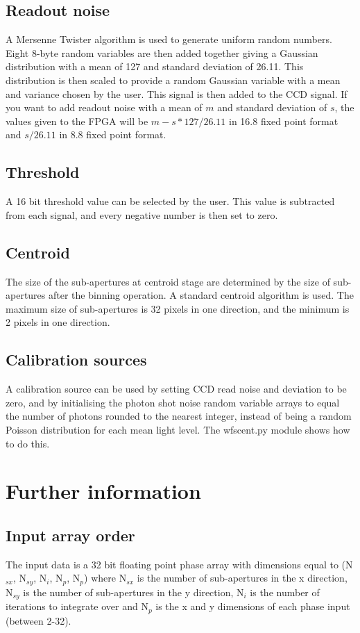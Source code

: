\documentclass{article}
\begin{document}
\subsection{Readout noise}
A Mersenne Twister algorithm is used to generate uniform random
numbers.  Eight 8-byte random variables are then added together giving
a Gaussian distribution with a mean of 127 and standard deviation of
26.11.  This distribution is then scaled to provide a random Gaussian
variable with a mean and variance chosen by the user.  This signal is
then added to the CCD signal.  If you want to add readout noise with a
mean of $m$ and standard deviation of $s$, the values given to the
FPGA will be $m-s*127/26.11$ in 16.8 fixed point format and $s/26.11$
in 8.8 fixed point format.

\subsection{Threshold}
A 16 bit threshold value can be selected by the user.  This value is
subtracted from each signal, and every negative number is then set to
zero.  

\subsection{Centroid}
The size of the sub-apertures at centroid stage are determined by the
size of sub-apertures after the binning operation.  A standard
centroid algorithm is used.  The maximum size of sub-apertures is 32
pixels in one direction, and the minimum is 2 pixels in one direction.

\subsection{Calibration sources}
A calibration source can be used by setting CCD read noise and
deviation to be zero, and by initialising the photon shot noise random
variable arrays to equal the number of photons rounded to the nearest
integer, instead of being a random Poisson distribution for each mean
light level.  The wfscent.py module shows how to do this.

\section{Further information}
\subsection{Input array order}
The input data is a 32 bit floating point phase array with dimensions
equal to (N$_{sx}$, N$_{sy}$, N$_{i}$, N$_p$, N$_p$) where N$_{sx}$ is
the number of sub-apertures in the x direction, N$_{sy}$ is the number
of sub-apertures in the y direction, N$_i$ is the number of iterations
to integrate over and N$_p$ is the x and y dimensions of each phase
input (between 2-32).
\end{document}
